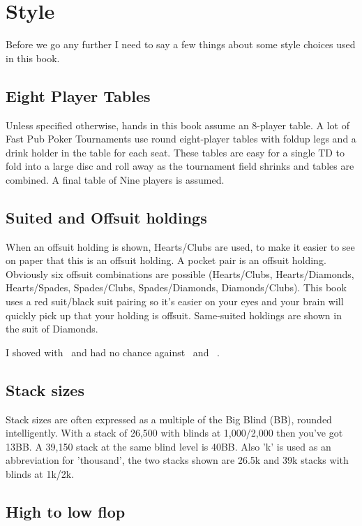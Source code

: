 \chapter{Style}


Before we go any further I need to say a few things about
some style choices used in this book.

\section*{Eight Player Tables}

Unless specified otherwise, hands in this book assume an
8-player table. A lot of Fast Pub Poker Tournaments use
round eight-player tables with foldup legs and a drink holder
in the table for each seat. These tables are easy for a single TD
to fold into a large disc and roll away as the tournament
field shrinks and tables are combined. A final table of Nine players
is assumed.

\section*{Suited and Offsuit holdings}

When an offsuit holding is shown, Hearts/Clubs are used, to make
it easier to see on paper that this is an offsuit holding. A pocket
pair is an offsuit holding. Obviously six offsuit combinations are
possible (Hearts/Clubs, Hearts/Diamonds, Hearts/Spades, Spades/Clubs,
Spades/Diamonds, Diamonds/Clubs). This book uses a red suit/black suit
pairing so it's easier on your eyes and your brain will quickly pick
up that your holding is offsuit. Same-suited
holdings are shown in the suit of Diamonds.

I shoved with \Ah\tenc\ and had no chance against \Ad\Kd\ and \Jh\Jc\ .

\section*{Stack sizes}

Stack sizes are often expressed as a multiple of the Big Blind (BB),
rounded intelligently. With a stack of 26,500 with blinds at 1,000/2,000
then you've got 13BB. A 39,150 stack at the same blind level is 40BB.
Also 'k' is used as an abbreviation for 'thousand', the two stacks
shown are 26.5k and 39k stacks with blinds at 1k/2k.

\section*{High to low flop}

